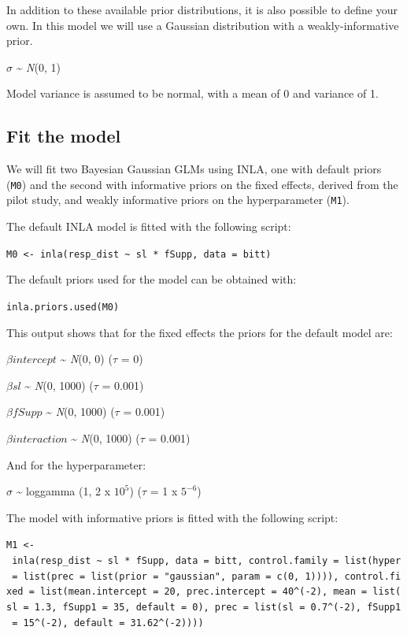 \documentclass[
]{book}
\begin{document}
In addition to these available prior distributions, it is also possible to define your own. In this model we will use a Gaussian distribution with a weakly-informative prior.

\(\sigma\) \textasciitilde{} \emph{N}(0, 1)

Model variance is assumed to be normal, with a mean of 0 and variance of 1.

\hypertarget{fit-the-model}{%
\subsection{Fit the model}\label{fit-the-model}}

We will fit two Bayesian Gaussian GLMs using INLA, one with default priors (\texttt{M0}) and the second with informative priors on the fixed effects, derived from the pilot study, and weakly informative priors on the hyperparameter (\texttt{M1}).

The default INLA model is fitted with the following script:

\texttt{M0\ \textless{}-\ inla(resp\_dist\ \textasciitilde{}\ sl\ *\ fSupp,\ data\ =\ bitt)}

The default priors used for the model can be obtained with:

\texttt{inla.priors.used(M0)}

This output shows that for the fixed effects the priors for the default model are:

\(\beta intercept\) \textasciitilde{} \emph{N}(0, 0) (\(\tau\) = 0)

\(\beta sl\) \textasciitilde{} \emph{N}(0, 1000) (\(\tau\) = 0.001)

\(\beta fSupp\) \textasciitilde{} \emph{N}(0, 1000) (\(\tau\) = 0.001)

\(\beta interaction\) \textasciitilde{} \emph{N}(0, 1000) (\(\tau\) = 0.001)

And for the hyperparameter:

\(\sigma\) \textasciitilde{} loggamma (1, 2 x \(10^{5}\)) (\(\tau\) = 1 x \(5^{-6}\))

The model with informative priors is fitted with the following script:

\texttt{M1\ \textless{}-\ inla(resp\_dist\ \textasciitilde{}\ sl\ *\ fSupp,\ data\ =\ bitt,\ control.family\ =\ list(hyper\ =\ list(prec\ =\ list(prior\ =\ "gaussian",\ param\ =\ c(0,\ 1)))),\ control.fixed\ =\ list(mean.intercept\ =\ 20,\ prec.intercept\ =\ 40\^{}(-2),\ mean\ =\ list(sl\ =\ 1.3,\ fSupp1\ =\ 35,\ default\ =\ 0),\ prec\ =\ list(sl\ =\ 0.7\^{}(-2),\ fSupp1\ =\ 15\^{}(-2),\ default\ =\ 31.62\^{}(-2))))}
\end{document}
